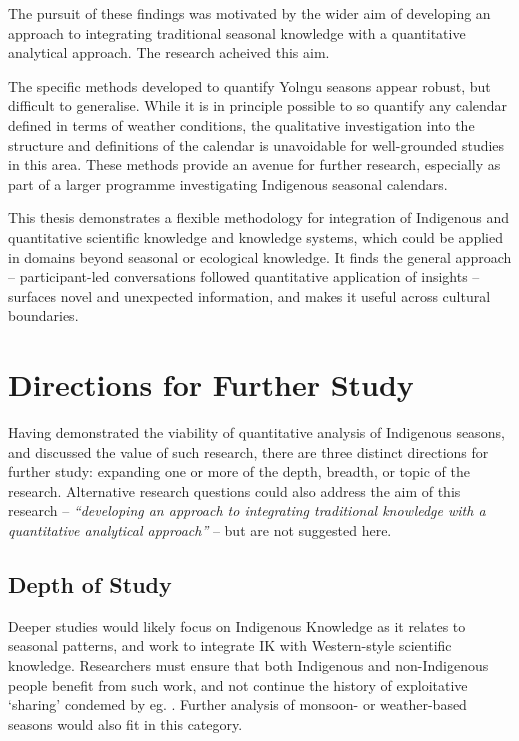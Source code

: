 The pursuit of these findings was motivated by the wider aim of developing
an approach to integrating traditional seasonal knowledge with a quantitative
analytical approach.  The research acheived this aim.

The specific methods developed to quantify Yolngu seasons appear robust, but
difficult to generalise.  While it is in principle possible to so quantify
any calendar defined in terms of weather conditions, the qualitative
investigation into the structure and definitions of the calendar is unavoidable
for well-grounded studies in this area.  These methods provide an
avenue for further research, especially as part of a larger programme
investigating Indigenous seasonal calendars.

This thesis demonstrates a flexible methodology for integration
of Indigenous and quantitative scientific knowledge and knowledge systems,
which could be applied in domains beyond seasonal or ecological knowledge.
It finds the general approach -- participant-led conversations followed quantitative
application of insights -- surfaces novel and unexpected information, and
makes it useful across cultural boundaries.



\section{Directions for Further Study}
\label{sec:further-study}

Having demonstrated the viability of quantitative analysis of Indigenous
seasons, and discussed the value of such research, there are three distinct
directions for further study:  expanding one or more of the depth, breadth,
or topic of the research.  Alternative research questions could also address the aim
of this research -- \textit{``developing an approach to integrating traditional
knowledge with a quantitative analytical approach''} -- but are not suggested
here.

\subsection{Depth of Study}
Deeper studies would likely focus on Indigenous Knowledge as it
relates to seasonal patterns, and work to integrate IK with Western-style scientific
knowledge.  Researchers must ensure that both Indigenous and non-Indigenous
people benefit from such work, and not continue the history of exploitative
`sharing' condemed by eg. \citet{smith1999}.  Further analysis of monsoon-
or weather-based seasons would also fit in this category.

